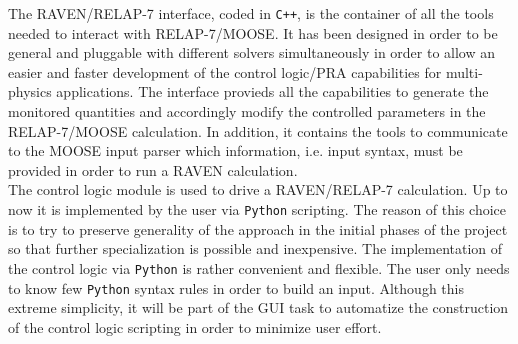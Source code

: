 \documentclass{anstrans}
\begin{document}
The RAVEN/RELAP-7 interface, coded in \verb!C++!, is the container of all the tools needed to interact with RELAP-7/MOOSE. It has been designed in order to be general and pluggable with different solvers simultaneously in order to allow an easier and faster development of the control logic/PRA capabilities for multi-physics applications.
The interface provieds all the capabilities to generate the monitored quantities and accordingly modify the controlled parameters in the RELAP-7/MOOSE calculation.
In addition, it contains the tools to communicate to the MOOSE input parser which information, i.e. input syntax, must be provided in order to run a RAVEN  calculation.\\The control logic module is used to drive a RAVEN/RELAP-7 calculation. Up to now it is implemented by the user via \verb!Python! scripting. The reason of this choice is to try to preserve generality of the approach in the initial phases of the project so that further specialization is possible and  inexpensive. The implementation of the control logic via \verb!Python! is rather convenient and flexible. The user only needs to know few \verb!Python! syntax rules in order to build an input. Although this extreme simplicity, it will be part of the GUI task to automatize the construction of the control logic scripting in order to minimize user effort.
\end{document}
